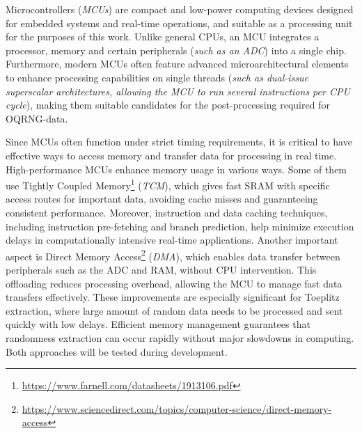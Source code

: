 Microcontrollers (\emph{MCUs}) are compact and low-power computing devices designed for embedded systems and real-time operations, and suitable as a processing unit for the purposes of this work. Unlike general CPUs, an MCU integrates a processor, memory and certain peripherals (\emph{such as an ADC}) into a single chip. Furthermore, modern MCUs often feature advanced microarchitectural elements to enhance processing capabilities on single threads (\emph{such as dual-issue superscalar architectures, allowing the MCU to run several instructions per CPU cycle}), making them suitable candidates for the post-processing required for OQRNG-data.

Since MCUs often function under strict timing requirements, it is critical to have effective ways to access memory and transfer data for processing in real time. High-performance MCUs enhance memory usage in various ways. Some of them use Tightly Coupled Memory\footnote{\url{https://www.farnell.com/datasheets/1913106.pdf}} (\emph{TCM}), which gives fast SRAM with specific access routes for important data, avoiding cache misses and guaranteeing consistent performance. Moreover, instruction and data caching techniques, including instruction pre-fetching and branch prediction, help minimize execution delays in computationally intensive real-time applications. Another important aspect is Direct Memory Access\footnote{\url{https://www.sciencedirect.com/topics/computer-science/direct-memory-access}} (\emph{DMA}), which enables data transfer between peripherals such as the ADC and RAM, without CPU intervention. This offloading reduces processing overhead, allowing the MCU to manage fast data transfers effectively. These improvements are especially significant for Toeplitz extraction, where large amount of random data needs to be processed and sent quickly with low delays. Efficient memory management guarantees that randomness extraction can occur rapidly without major slowdowns in computing. Both approaches will be tested during development.


